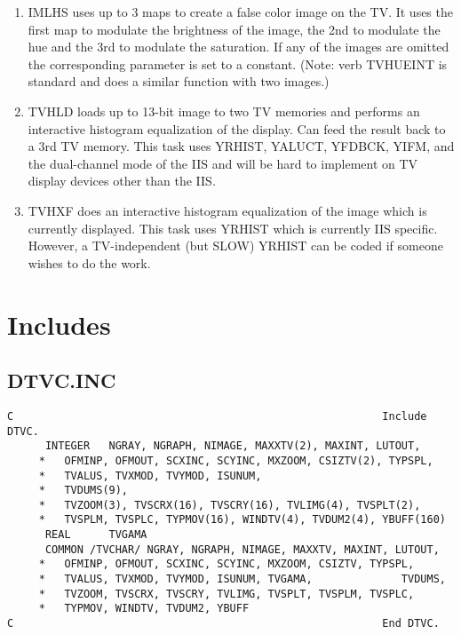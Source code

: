 \begin{enumerate} %
\item IMLHS uses up to 3 maps to create a false color
image on the TV. It
uses the first map to modulate the brightness of the image, the 2nd to
modulate the hue and the 3rd to modulate the saturation.  If any of
the images are omitted the corresponding parameter is set to a
constant. (Note: verb TVHUEINT is standard and does a
similar function with two images.)
\item TVHLD loads up to 13-bit image to two TV memories and performs an
interactive histogram equalization of the display. Can feed the result
back to a 3rd TV memory.  This task uses YRHIST, YALUCT, YFDBCK, YIFM,
and the dual-channel mode of the IIS and will be hard to implement on
TV display devices other than the
IIS.
\item TVHXF does an interactive histogram equalization of
the image which is
currently displayed.  This task uses YRHIST which is currently IIS
specific.  However, a TV-independent (but SLOW) YRHIST can be coded if
someone wishes to do the work.

\end{enumerate} %

\section{Includes}
\subsection{DTVC.INC}
\begin{verbatim}
C                                                          Include DTVC.
      INTEGER   NGRAY, NGRAPH, NIMAGE, MAXXTV(2), MAXINT, LUTOUT,
     *   OFMINP, OFMOUT, SCXINC, SCYINC, MXZOOM, CSIZTV(2), TYPSPL,
     *   TVALUS, TVXMOD, TVYMOD, ISUNUM,
     *   TVDUMS(9),
     *   TVZOOM(3), TVSCRX(16), TVSCRY(16), TVLIMG(4), TVSPLT(2),
     *   TVSPLM, TVSPLC, TYPMOV(16), WINDTV(4), TVDUM2(4), YBUFF(160)
      REAL      TVGAMA
      COMMON /TVCHAR/ NGRAY, NGRAPH, NIMAGE, MAXXTV, MAXINT, LUTOUT,
     *   OFMINP, OFMOUT, SCXINC, SCYINC, MXZOOM, CSIZTV, TYPSPL,
     *   TVALUS, TVXMOD, TVYMOD, ISUNUM, TVGAMA,              TVDUMS,
     *   TVZOOM, TVSCRX, TVSCRY, TVLIMG, TVSPLT, TVSPLM, TVSPLC,
     *   TYPMOV, WINDTV, TVDUM2, YBUFF
C                                                          End DTVC.
\end{verbatim}


